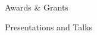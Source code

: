 \begin{small}
\begin{cvlist}{Awards \& Grants}
\item
\end{cvlist}

\begin{cvlist}{Presentations and Talks}
\item
\end{cvlist}


\end{small}
